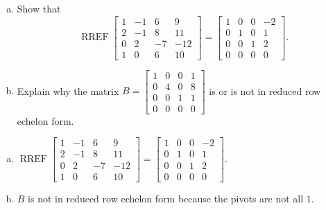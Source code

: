 
\begin{exerciseStatement}

\begin{enumerate}[(a)]
\item Show that \[\operatorname{RREF} \left[\begin{array}{cccc}
1 & -1 & 6 & 9 \\
2 & -1 & 8 & 11 \\
0 & 2 & -7 & -12 \\
1 & 0 & 6 & 10
\end{array}\right] = \left[\begin{array}{cccc}
1 & 0 & 0 & -2 \\
0 & 1 & 0 & 1 \\
0 & 0 & 1 & 2 \\
0 & 0 & 0 & 0
\end{array}\right] .\]
\item Explain why the matrix \(B= \left[\begin{array}{cccc}
1 & 0 & 0 & 1 \\
0 & 4 & 0 & 8 \\
0 & 0 & 1 & 1 \\
0 & 0 & 0 & 0
\end{array}\right] \) is or is not in reduced row echelon form.
\end{enumerate}
    
\end{exerciseStatement}
    
\begin{exerciseAnswer} 

\begin{enumerate}[(a)]
\item \(\operatorname{RREF} \left[\begin{array}{cccc}
1 & -1 & 6 & 9 \\
2 & -1 & 8 & 11 \\
0 & 2 & -7 & -12 \\
1 & 0 & 6 & 10
\end{array}\right] = \left[\begin{array}{cccc}
1 & 0 & 0 & -2 \\
0 & 1 & 0 & 1 \\
0 & 0 & 1 & 2 \\
0 & 0 & 0 & 0
\end{array}\right] .\)
\item \(B\) is not in reduced row echelon form because the pivots are not all \(1\). 
\end{enumerate}
    
\end{exerciseAnswer}
    
